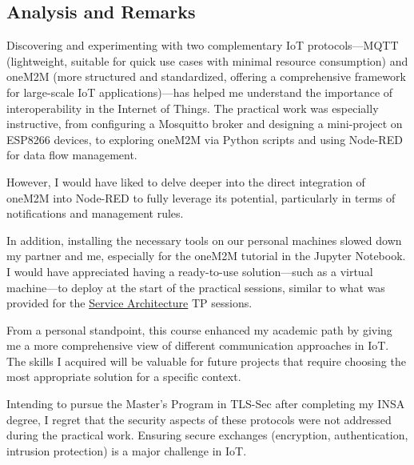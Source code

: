\subsection{Analysis and Remarks}
Discovering and experimenting with two complementary IoT protocols—MQTT (lightweight, suitable for quick use cases with minimal resource consumption) and oneM2M (more structured and standardized, offering a comprehensive framework for large-scale IoT applications)—has helped me understand the importance of interoperability in the Internet of Things. The practical work was especially instructive, from configuring a Mosquitto broker and designing a mini-project on ESP8266 devices, to exploring oneM2M via Python scripts and using Node-RED for data flow management.

However, I would have liked to delve deeper into the direct integration of oneM2M into Node-RED to fully leverage its potential, particularly in terms of notifications and management rules.

In addition, installing the necessary tools on our personal machines slowed down my partner and me, especially for the oneM2M tutorial in the Jupyter Notebook. I would have appreciated having a ready-to-use solution—such as a virtual machine—to deploy at the start of the practical sessions, similar to what was provided for the \hyperref[sec:service_architecture]{Service Architecture} TP sessions.

From a personal standpoint, this course enhanced my academic path by giving me a more comprehensive view of different communication approaches in IoT. The skills I acquired will be valuable for future projects that require choosing the most appropriate solution for a specific context.

Intending to pursue the Master’s Program in TLS-Sec after completing my INSA degree, I regret that the security aspects of these protocols were not addressed during the practical work. Ensuring secure exchanges (encryption, authentication, intrusion protection) is a major challenge in IoT.
